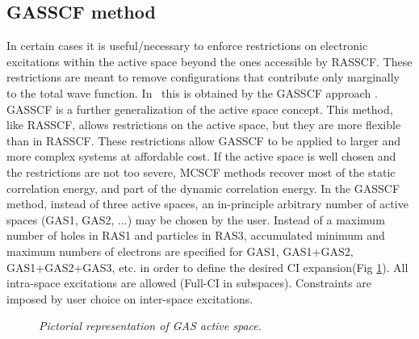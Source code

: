 \subsection{GASSCF method}
In certain cases it is useful/necessary to enforce restrictions on electronic
excitations within the active space beyond the ones accessible by RASSCF.
These restrictions are meant to remove configurations that contribute only
marginally to the total wave function.
In \molcas\ this is obtained by the GASSCF approach \cite{gas2011}.
GASSCF is a further generalization of the active space concept.
This method, like RASSCF, allows restrictions on the active space,
but they are more flexible than in RASSCF. These restrictions allow GASSCF to be applied to
larger and more complex systems at affordable cost. If the active space is well chosen and the
restrictions are not too severe, MCSCF methods recover most of the static correlation energy,
and part of the dynamic correlation energy. In the GASSCF method, instead
of three active spaces, an in-principle arbitrary number of active spaces (GAS1, GAS2, ...) may
be chosen by the user. Instead of a maximum number of holes in RAS1 and particles in RAS3,
accumulated minimum and maximum numbers of electrons are specified for GAS1,
GAS1+GAS2, GAS1+GAS2+GAS3, etc. in order to define the desired CI expansion\ifmanual (Fig \ref{fig:gas})\fi.
All intra-space excitations are allowed (Full-CI in subspaces).
Constraints are imposed by user choice on inter-space excitations.
\ifmanual
\begin{figure}
\centering
{}
\caption{\em Pictorial representation of GAS active space.}
\label{fig:gas}
\end{figure}
\fi

